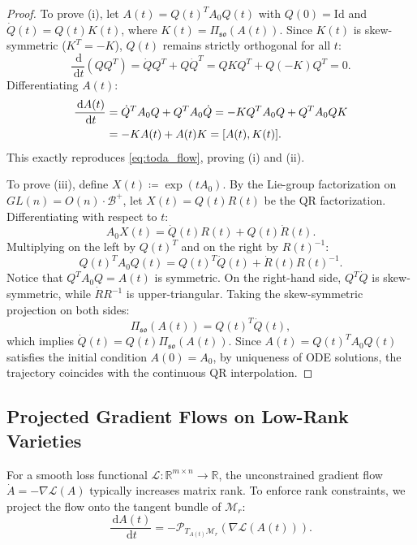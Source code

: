 \documentclass[11pt,a4paper,reqno]{amsart}
\theoremstyle{definition}
\numberwithin{equation}{section}
\newcommand{\R}{\mathbb{R}}
\newcommand{\Id}{\mathrm{Id}}
\newcommand{\dif}{\,\mathrm{d}}
\begin{document}
\begin{proof}
To prove (i), let $A(t) = Q(t)^T A_0 Q(t)$ with $Q(0) = \Id$ and $\dot{Q}(t) = Q(t) K(t)$, where $K(t) = \Pi_{\mathfrak{so}}(A(t))$. Since $K(t)$ is skew-symmetric ($K^T = -K$), $Q(t)$ remains strictly orthogonal for all $t$:
\begin{equation}
    \frac{\dif}{\dif t}(Q Q^T) = \dot{Q} Q^T + Q \dot{Q}^T = Q K Q^T + Q (-K) Q^T = 0.
\end{equation}
Differentiating $A(t)$:
\begin{align}
    \frac{\dif A(t)}{\dif t} &= \dot{Q}^T A_0 Q + Q^T A_0 \dot{Q} = -K Q^T A_0 Q + Q^T A_0 Q K \notag \\
    &= -K A(t) + A(t) K = [A(t), K(t)].
\end{align}
This exactly reproduces \eqref{eq:toda_flow}, proving (i) and (ii).

To prove (iii), define $X(t) \coloneqq \exp(t A_0)$. By the Lie-group factorization on $GL(n) = O(n) \cdot \mathcal{B}^+$, let $X(t) = Q(t) R(t)$ be the QR factorization. Differentiating with respect to $t$:
\begin{equation}
    A_0 X(t) = \dot{Q}(t) R(t) + Q(t) \dot{R}(t).
\end{equation}
Multiplying on the left by $Q(t)^T$ and on the right by $R(t)^{-1}$:
\begin{equation}
    Q(t)^T A_0 Q(t) = Q(t)^T \dot{Q}(t) + \dot{R}(t) R(t)^{-1}.
\end{equation}
Notice that $Q^T A_0 Q = A(t)$ is symmetric. On the right-hand side, $Q^T \dot{Q}$ is skew-symmetric, while $\dot{R} R^{-1}$ is upper-triangular. Taking the skew-symmetric projection on both sides:
\begin{equation}
    \Pi_{\mathfrak{so}}(A(t)) = Q(t)^T \dot{Q}(t),
\end{equation}
which implies $\dot{Q}(t) = Q(t) \Pi_{\mathfrak{so}}(A(t))$. Since $A(t) = Q(t)^T A_0 Q(t)$ satisfies the initial condition $A(0) = A_0$, by uniqueness of ODE solutions, the trajectory coincides with the continuous QR interpolation.
\end{proof}

\subsection{Projected Gradient Flows on Low-Rank Varieties}
For a smooth loss functional $\mathcal{L} \colon \R^{m \times n} \to \R$, the unconstrained gradient flow $\dot{A} = -\nabla \mathcal{L}(A)$ typically increases matrix rank. To enforce rank constraints, we project the flow onto the tangent bundle of $\mathcal{M}_r$:
\begin{equation}
    \label{eq:projected_flow}
    \frac{\dif A(t)}{\dif t} = -\mathcal{P}_{T_{A(t)} \mathcal{M}_r}(\nabla \mathcal{L}(A(t))).
\end{equation}
\end{document}
